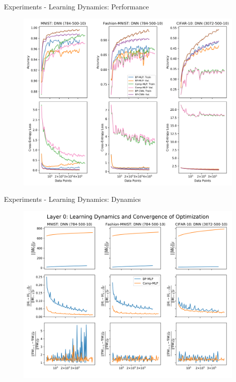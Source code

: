 \documentclass[dvipsnames, usenames]{beamer}
\begin{document}
\begin{frame}{Experiments - Learning Dynamics: Performance}
	\begin{figure}
		\centering
		\includegraphics[width=\textwidth]{../figures/learning}
	\end{figure}
\end{frame}


\begin{frame}{Experiments - Learning Dynamics: Dynamics}
	\begin{figure}
		\centering
		\includegraphics[width=\textwidth]{../figures/dynamics_l0}
	\end{figure}
\end{frame}
\end{document}
